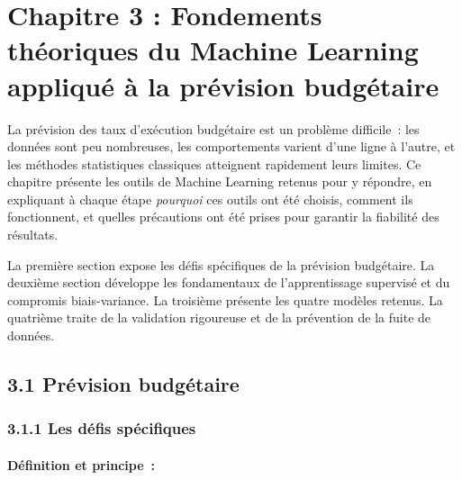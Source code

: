 \section*{Chapitre 3 : Fondements théoriques du Machine Learning appliqué à la prévision budgétaire}

\bigskip

La prévision des taux d'exécution budgétaire est un problème difficile~: les données
sont peu nombreuses, les comportements varient d'une ligne à l'autre, et les méthodes
statistiques classiques atteignent rapidement leurs limites. Ce chapitre présente les
outils de Machine Learning retenus pour y répondre, en expliquant à chaque étape
\textit{pourquoi} ces outils ont été choisis, comment ils fonctionnent, et quelles
précautions ont été prises pour garantir la fiabilité des résultats.

La première section expose les défis spécifiques de la prévision budgétaire.
La deuxième section développe les fondamentaux de l'apprentissage supervisé et du 
compromis biais-variance. La troisième présente les quatre modèles retenus.
La quatrième traite de la validation rigoureuse et de la prévention de la fuite de données.

\subsection*{3.1 \quad Prévision budgétaire}

\subsubsection*{3.1.1 \quad Les défis spécifiques}

\paragraph{Définition et principe~:}

